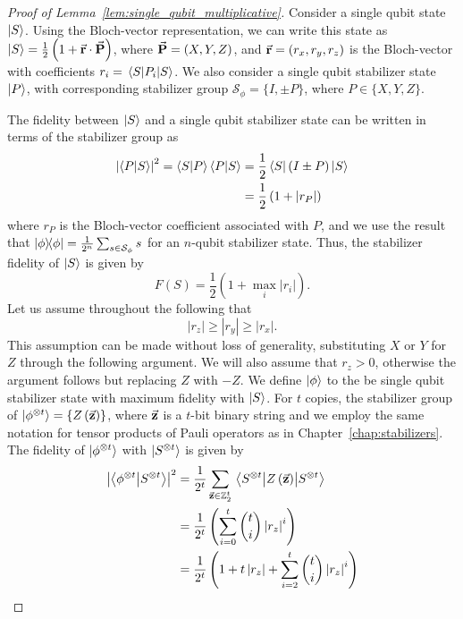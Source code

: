 \begin{proof}[Proof of Lemma~\ref{lem:single_qubit_multiplicative}]

Consider a single qubit state $\ket{S}$. Using the Bloch-vector representation, we can write this state as $\ket{S}=\frac{1}{2}\left(1+\va{r}\cdot\va{P}\right)$, where $\va{P}=\left(X,Y,Z\right)$, and $\va{r}=\left(r_{x},r_{y},r_{z}\right)$ is the Bloch-vector with coefficients $r_{i}=\matrixel{S}{P_{i}}{S}$.
We also consider a single qubit stabilizer state $\ket{P}$, with corresponding stabilizer group $\mathcal{S}_{\phi}=\{I, \pm P\}$, where $P\in \{X, Y, Z\}$.\par
The fidelity between $\ket{S}$ and a single qubit stabilizer state can be written in terms of the stabilizer group as
\begin{align*}
\left|\braket{P}{S}\right|^{2}=\braket{S}{P}\braket{P}{S}&=\frac{1}{2} \bra{S}\left(I \pm P\right)\ket{S}\\
&=\frac{1}{2}\left(1+\left|r_{P}\right|\right)
\end{align*}
where $r_{P}$ is the Bloch-vector coefficient associated with $P$, and we use the result that $\ketbra{\phi}=\frac{1}{2^{n}}\sum_{s\in\mathcal{S}_{\phi}}s$ for an $n$-qubit stabilizer state. Thus, the stabilizer fidelity of $\ket{S}$ is given by 
\[F(S)=\frac{1}{2}\left(1+\max_{i}\left|r_{i}\right|\right).\]
Let us assume throughout the following that 
\[\left|r_{z}\right| \geq \left|r_{y}\right| \geq \left|r_{x}\right|.\]
This assumption can be made without loss of generality, substituting $X$ or $Y$ for $Z$ through the following argument. We will also assume that $r_{z}>0$, otherwise the argument follows but replacing $Z$ with $-Z$. We define $\ket{\phi}$ to the be single qubit stabilizer state with maximum fidelity with $\ket{S}$.
For $t$ copies, the stabilizer group of $\ket{\phi^{\otimes t}}=\{Z\left(\va{z}\right)\}$, where $\va{z}$ is a $t$-bit binary string and we employ the same notation for tensor products of Pauli operators as in Chapter~\ref{chap:stabilizers}. The fidelity of $\ket{\phi^{\otimes t}}$ with $\ket{S^{\otimes t}}$ is given by
\begin{align}
\left|\braket{\phi^{\otimes t}}{S^{\otimes t}}\right|^{2} &= \frac{1}{2^{t}}\sum_{\va{z}\in\mathbb{Z}_{2}^{t}}\matrixel{S^{\otimes t}}{Z\left(\va{z}\right)}{S^{\otimes t}}\nonumber\\
&= \frac{1}{2^{t}}\left(\sum_{i=0}^{t}\binom{t}{i}\left|r_{z}\right|^{i}\right) \nonumber\\&=
\frac{1}{2^{t}} \left( 1+t\left|r_{z}\right| + \sum_{i=2}^{t}\binom{t}{i}\left|r_{z}\right|^{i} \right)

\end{align}
\end{proof}
